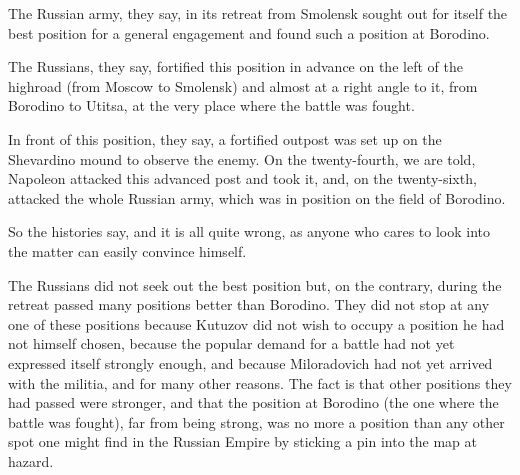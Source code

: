 The Russian army, they say, in its retreat from Smolensk sought
out for itself the best position for a general engagement and
found such a position at Borodino.

The Russians, they say, fortified this position in advance on the
left of the highroad (from Moscow to Smolensk) and almost at a
right angle to it, from Borodino to Utitsa, at the very place
where the battle was fought.

In front of this position, they say, a fortified outpost was set
up on the Shevardino mound to observe the enemy. On the
twenty-fourth, we are told, Napoleon attacked this advanced post
and took it, and, on the twenty-sixth, attacked the whole Russian
army, which was in position on the field of Borodino.

So the histories say, and it is all quite wrong, as anyone who
cares to look into the matter can easily convince himself.

The Russians did not seek out the best position but, on the
contrary, during the retreat passed many positions better than
Borodino. They did not stop at any one of these positions because
Kutuzov did not wish to occupy a position he had not himself
chosen, because the popular demand for a battle had not yet
expressed itself strongly enough, and because Miloradovich had
not yet arrived with the militia, and for many other reasons. The
fact is that other positions they had passed were stronger, and
that the position at Borodino (the one where the battle was
fought), far from being strong, was no more a position than any
other spot one might find in the Russian Empire by sticking a pin
into the map at hazard.

